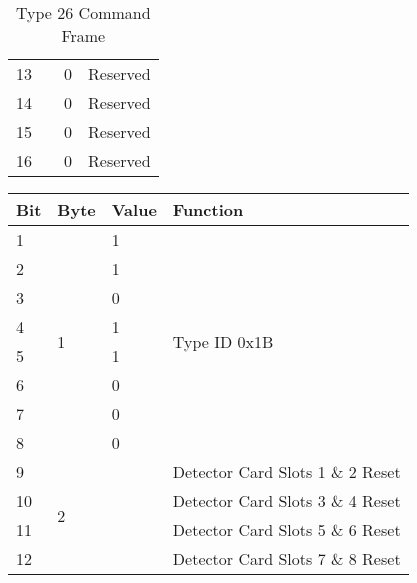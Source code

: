 \documentclass[]{article}
\begin{document}
\begin{table}[ht]
\begin{tabular}{llll}
		13           &                    & 0                 & Reserved                         \\
		14           &                    & 0                 & Reserved                         \\
		15           &                    & 0                 & Reserved                         \\
		16           &                    & 0                 & Reserved                         \\ \hline
	\end{tabular}
	\caption{Type 26 Command Frame}
	\label{tab:type-26-frame}
\end{table}

\begin{table}[ht]
	\centering
	\begin{tabular}{llll}
		\hline
		\textbf{Bit} & \textbf{Byte}      & \textbf{Value}    & \textbf{Function}                \\ \hline
		1            & \multirow{8}{*}{1} & 1                 & \multirow{8}{*}{Type ID 0x1B}    \\
		2            &                    & 1                 &                                  \\
		3            &                    & 0                 &                                  \\
		4            &                    & 1                 &                                  \\
		5            &                    & 1                 &                                  \\
		6            &                    & 0                 &                                  \\
		7            &                    & 0                 &                                  \\
		8            &                    & 0                 &                                  \\ \hline
		9            & \multirow{8}{*}{2} & \multirow{4}{*}{} & Detector Card Slots 1 \& 2 Reset \\
		10           &                    &                   & Detector Card Slots 3 \& 4 Reset \\
		11           &                    &                   & Detector Card Slots 5 \& 6 Reset \\
		12           &                    &                   & Detector Card Slots 7 \& 8 Reset \\ \cline{3-4} 

\end{tabular}
\end{table}
\end{document}
